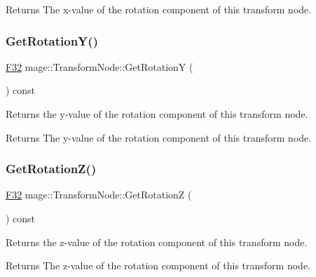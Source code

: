 \begin{DoxyReturn}{Returns}
The x-\/value of the rotation component of this transform node. 
\end{DoxyReturn}
\hypertarget{classmage_1_1_transform_node_a620a6a7d11b3541f17e0492fdf48d9ab}{}\label{classmage_1_1_transform_node_a620a6a7d11b3541f17e0492fdf48d9ab} 
\subsubsection{\texorpdfstring{Get\+Rotation\+Y()}{GetRotationY()}}
{\footnotesize\ttfamily \hyperlink{namespacemage_aa97e833b45f06d60a0a9c4fc22ae02c0}{F32} mage\+::\+Transform\+Node\+::\+Get\+RotationY (\begin{DoxyParamCaption}{ }\end{DoxyParamCaption}) const\hspace{0.3cm}{\ttfamily [noexcept]}}

Returns the y-\/value of the rotation component of this transform node.

\begin{DoxyReturn}{Returns}
The y-\/value of the rotation component of this transform node. 
\end{DoxyReturn}
\hypertarget{classmage_1_1_transform_node_a3c08b93f62e5d741c95a97ae9b42e039}{}\label{classmage_1_1_transform_node_a3c08b93f62e5d741c95a97ae9b42e039} 
\subsubsection{\texorpdfstring{Get\+Rotation\+Z()}{GetRotationZ()}}
{\footnotesize\ttfamily \hyperlink{namespacemage_aa97e833b45f06d60a0a9c4fc22ae02c0}{F32} mage\+::\+Transform\+Node\+::\+Get\+RotationZ (\begin{DoxyParamCaption}{ }\end{DoxyParamCaption}) const\hspace{0.3cm}{\ttfamily [noexcept]}}

Returns the z-\/value of the rotation component of this transform node.

\begin{DoxyReturn}{Returns}
The z-\/value of the rotation component of this transform node. 
\end{DoxyReturn}
\hypertarget{classmage_1_1_transform_node_ac786e3f763d98882b6ad35e43efe6898}{}\label{classmage_1_1_transform_node_ac786e3f763d98882b6ad35e43efe6898} 
